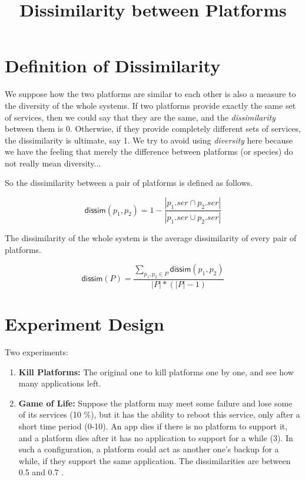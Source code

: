\documentclass{article}
\def\dissim{{\mathsf{dissim}}}
\begin{document}
\title{Dissimilarity between Platforms}

\maketitle

\section{Definition of Dissimilarity}

We suppose how the two platforms are similar to each other is also a measure to the diversity of the whole systems. If two platforms provide exactly the same set of services, then we could say that they are the same, and the \emph{dissimilarity} between them is 0. Otherwise, if they provide completely different sets of services, the dissimilarity is ultimate, say 1. We try to avoid using \emph{diversity} here because we have the feeling that merely the difference between platforms (or species) do not really mean diversity...

So the dissimilarity between a pair of platforms is defined as follows.

\[
	\dissim(p_1, p_2) = 1 - \frac{\left|p_1.ser \cap p_2.ser\right| }{\left|p_1.ser \cup p_2.ser\right| }
\]

The dissimilarity of the whole system is the average dissimilarity of every pair of platforms.

\[\dissim(P) = \frac{\sum_{p_1,p_2 \in P}\dissim(p_1, p_2)}{\left| P \right| * (\left| P \right|-1)}\]


\section{Experiment Design}

Two experiments:

\begin{enumerate}

\item
\textbf{Kill Platforms:} The original one to kill platforms one by one, and see how many applications left.

\item
\textbf{Game of Life:} Suppose the platform may meet some failure and lose some of its services (10 \%), but it has the ability to reboot this service, only after a short time period (0-10). An app dies if there is no platform to support it, and a platform dies after it has no application to support for a while (3). In such a configuration, a platform could act as another one's backup for a while, if they support the same application. The dissimilarities are between 0.5 and 0.7 .

\end{enumerate}
\end{document}
